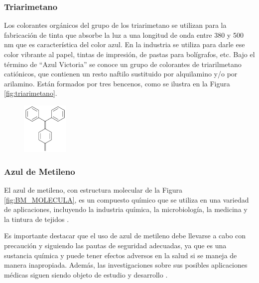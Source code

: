 \documentclass[12pt]{article}
\begin{document}
    \subsubsection{Triarimetano}
     Los colorantes orgánicos del grupo de los triarimetano se utilizan para la fabricación de tinta que absorbe la luz a una longitud de onda entre 380 y 500 nm que es característica del color azul. En la industria se utiliza para darle ese color vibrante al papel, tintas de impresión, de pastas para bolígrafos, etc. Bajo el término de “Azul Victoria” se conoce un grupo de colorantes de triarilmetano catiónicos, que contienen un resto naftilo sustituido por alquilamino y/o por arilamino\cite{IEEEreferencias:AM_1}. Están formados por tres bencenos, como se ilustra en la Figura \ref{fig:triarimetano}.
     \begin{figure}[H]
    	   \begin{center}
     	  	\includegraphics[width = 0.2\textwidth]{Imagenes/triarimetano.png}
    	   \end{center} 
        \end{figure}
     
  \subsubsection{Azul de Metileno}
    El azul de metileno, con estructura molecular de la Figura \ref{fig:BM_MOLECULA}, es un compuesto químico que se utiliza en una variedad de aplicaciones, incluyendo la industria química, la microbiología, la medicina y la tintura de tejidos \cite{IEEEreferencias:AM_1}. 

    Es importante destacar que el uso de azul de metileno debe llevarse a cabo con precaución y siguiendo las pautas de seguridad adecuadas, ya que es una sustancia química y puede tener efectos adversos en la salud si se maneja de manera inapropiada. Además, las investigaciones sobre sus posibles aplicaciones médicas siguen siendo objeto de estudio y desarrollo \cite{IEEEreferencias:AM_1}.\vspace{1em} %
\end{document}
